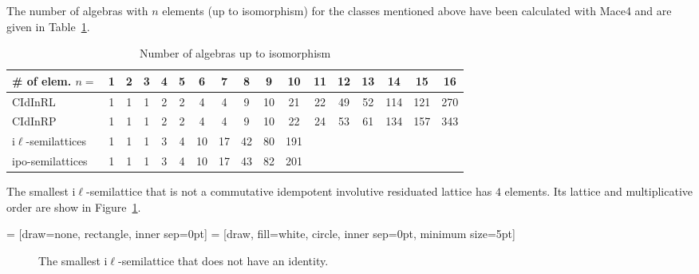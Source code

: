\documentclass[12pt]{amsart}
\begin{document}
The number of algebras with $n$ elements (up to isomorphism) for the classes mentioned above have been calculated with Mace4 \cite{McC2010} and are given in Table~\ref{size-n}.

\begin{table}
\begin{tabular}{l|cccccccccccccccc}
\# of elem. $n=$   &1&2&3&4&5& 6& 7& 8& 9&10&11&12&13&14&15&16\\\hline
CIdInRL       &1&1&1&2&2& 4& 4& 9&10&21&22&49&52&114&121&270\\
CIdInRP       &1&1&1&2&2& 4& 4& 9&10&22&24&53&61&134&157&343\\
i$\ell$-semilattices  &1&1&1&3&4&10&17&42&80&191&&&&&&\\
ipo-semilattices      &1&1&1&3&4&10&17&43&82&201&&&&&&\\
\end{tabular}

\medskip

\caption{Number of algebras up to isomorphism}\label{size-n}
\end{table}

The smallest i$\ell$-semilattice that is not a commutative idempotent involutive residuated lattice has $4$ elements. Its lattice and multiplicative order are show in Figure~\ref{cidil}.

 = [draw=none, rectangle, inner sep=0pt] %
 = [draw, fill=white, circle, inner sep=0pt, minimum size=5pt]
\begin{figure}%
\begin{center}
\qquad \qquad
{}
\end{center}
\caption{The smallest i$\ell$-semilattice that does not have an identity.}\label{cidil}
\end{figure}
\end{document}
